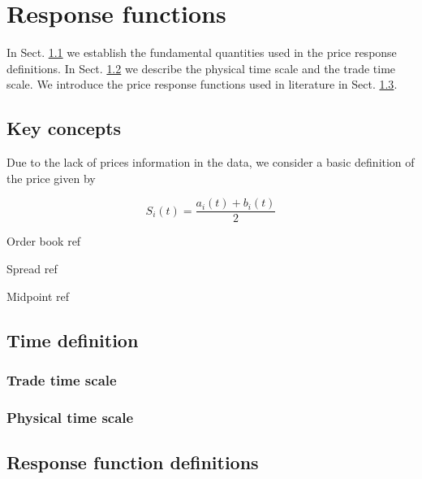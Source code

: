 \section{Response functions}\label{sec:response_functions_def}

In Sect. \ref{subsec:key_concepts} we establish the fundamental quantities used
in the price response definitions. In Sect. \ref{subsec:time_definition} we
describe the physical time scale and the trade time scale. We introduce the
price response functions used in literature in Sect. \ref{subsec:response_def}.

\subsection{Key concepts}\label{subsec:key_concepts}


Due to the lack of prices information in the data, we consider a basic definition
of the price given by \cite{patterns_forex,political_forex,forex_liquidity}

\begin{equation}
    S_{i} \left(t\right) = \frac{a_{i}\left(t\right) + b_{i}\left(t\right)}{2}
\end{equation}

Order book ref \cite{forex_structure}

Spread ref \cite{teach_spread}

Midpoint ref \cite{teach_spread}

\subsection{Time definition}\label{subsec:time_definition}

\subsubsection{Trade time scale}\label{subsubsec:trade_time}

\subsubsection{Physical time scale}\label{subsubsec:physical_time}

\subsection{Response function definitions}\label{subsec:response_def}